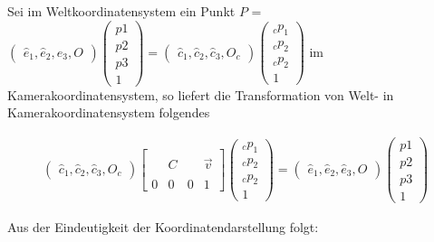 Sei im Weltkoordinatensystem ein Punkt \ensuremath{P} = \ensuremath{\begin{pmatrix}
		\hat{e}_1,\hat{e}_2,\hat{e}_3,O
	\end{pmatrix} 
	\begin{pmatrix}
		p1\\p2\\p3\\1
	\end{pmatrix} = 
	\begin{pmatrix}
		\hat{c}_1,\hat{c}_2,\hat{c}_3,O_c
	\end{pmatrix} 
	\begin{pmatrix}
		_cp_1\\
		_cp_2\\
		_cp_2\\
		1 
\end{pmatrix}} im Kamerakoordinatensystem, so liefert die Transformation von Welt- in  Kamerakoordinatensystem folgendes

\begin{gather}
\begin{pmatrix}
\hat{c}_1,\hat{c}_2,\hat{c}_3,O_c
\end{pmatrix}
\begin{bmatrix}
&  &  & \\
&  C&  &\vec{v} \\ 
&  &  & \\
0&0&0 & 1
\end{bmatrix}
\begin{pmatrix}
_cp_1\\
_cp_2\\
_cp_2\\
1 
\end{pmatrix} =
\begin{pmatrix}
\hat{e}_1,\hat{e}_2,\hat{e}_3,O
\end{pmatrix}
\begin{pmatrix}
p1\\p2\\p3\\1
\end{pmatrix}
\end{gather}

Aus der Eindeutigkeit der Koordinatendarstellung folgt:

